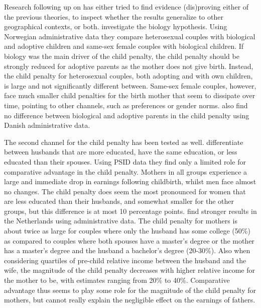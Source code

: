 \documentclass[10pt]{article}
\begin{document}
Research following up on \cite{kleven2019children} has either tried to find evidence (dis)proving either of the previous theories, to inspect whether the results generalize to other geographical contexts, or both. \cite{andresen2022causes} investigate the biology hypothesis. Using Norwegian administrative data they compare heterosexual couples with biological and adoptive children and same-sex female couples with biological children. If biology was the main driver of the child penalty, the child penalty should be strongly reduced for adoptive parents as the mother does not give birth. Instead, the child penalty for heterosexual couples, both adopting and with own children, is large and not significantly different between. Same-sex female couples, however, face much smaller child penalties for the birth mother that seem to dissipate over time, pointing to other channels, such as preferences or gender norms. \cite{kleven2021does} also find no difference between biological and adoptive parents in the child penalty using Danish administrative data.

The second channel for the child penalty has been tested as well. \cite{cortes2020children} differentiate between husbands that are more educated, have the same education, or less educated than their spouses. Using PSID data they find only a limited role for comparative advantage in the child penalty. Mothers in all groups experience a large and immediate drop in earnings following childbirth, whilst men face almost no changes. The child penalty does seem the most pronounced for women that are less educated than their husbands, and somewhat smaller for the other groups, but this difference is at most 10 percentage points. \cite{artmann2022household} find stronger results in the Netherlands using administrative data. The child penalty for mothers is about twice as large for couples where only the husband has some college (50\%) as compared to couples where both spouses have a master's degree or the mother has a master's degree and the husband a bachelor's degree (20-30\%). Also when considering quartiles of pre-child relative income between the husband and the wife, the magnitude of the child penalty decreases with higher relative income for the mother to be, with estimates ranging from 20\% to 40\%. Comparative advantage thus seems to play some role for the magnitude of the child penalty for mothers, but cannot really explain the negligible effect on the earnings of fathers.
\end{document}
